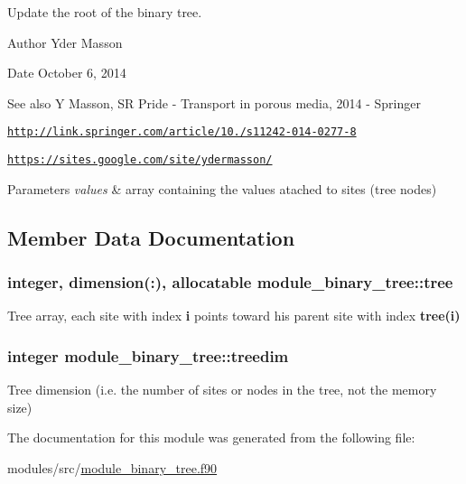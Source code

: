 \-Update the root of the binary tree. 

\begin{DoxyAuthor}{\-Author}
\-Yder \-Masson 
\end{DoxyAuthor}
\begin{DoxyDate}{\-Date}
\-October 6, 2014 
\end{DoxyDate}
\begin{DoxySeeAlso}{\-See also}
\-Y \-Masson, \-S\-R \-Pride -\/ \-Transport in porous media, 2014 -\/ \-Springer 

\href{http://link.springer.com/article/10.1007/s11242-014-0277-8}{\tt http\-://link.\-springer.\-com/article/10./s11242-\/014-\/0277-\/8} 

\href{https://sites.google.com/site/ydermasson/}{\tt https\-://sites.\-google.\-com/site/ydermasson/} 
\end{DoxySeeAlso}

\begin{DoxyParams}{\-Parameters}
{\em values} & array containing the values atached to sites (tree nodes) \\
\hline
\end{DoxyParams}


\subsection{\-Member \-Data \-Documentation}
\hypertarget{classmodule__binary__tree_a85d3e520ba717952e9c915f085fa2caf}{
\subsubsection[{tree}]{\setlength{\rightskip}{0pt plus 5cm}integer, dimension(\-:), allocatable {\bf module\-\_\-binary\-\_\-tree\-::tree}}}
\label{classmodule__binary__tree_a85d3e520ba717952e9c915f085fa2caf}


\-Tree array, each site with index {\bfseries i} points toward his parent site with index {\bfseries tree(i)} 

\hypertarget{classmodule__binary__tree_a61c89527c6e2f4f499d86efd842c571a}{
\subsubsection[{treedim}]{\setlength{\rightskip}{0pt plus 5cm}integer {\bf module\-\_\-binary\-\_\-tree\-::treedim}}}
\label{classmodule__binary__tree_a61c89527c6e2f4f499d86efd842c571a}


\-Tree dimension (i.\-e. the number of sites or nodes in the tree, not the memory size) 



\-The documentation for this module was generated from the following file\-:\begin{DoxyCompactItemize}
\item 
modules/src/\hyperlink{module__binary__tree_8f90}{module\-\_\-binary\-\_\-tree.\-f90}\end{DoxyCompactItemize}
